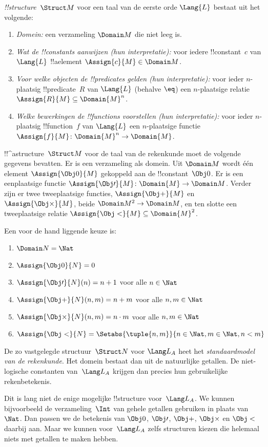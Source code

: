 \documentclass[openany]{memoir}
\begin{document}
\begin{defn}[!!^{structure}s]
 \emph{!!{structure}}~$\Struct M$ voor een taal van
de eerste orde $\Lang{L}$ bestaat uit het volgende:
\begin{enumerate}
\item \emph{Domein:} een verzameling $\Domain M$ die niet leeg is.
\item \emph{Wat de !!{constant}s aanwijzen (hun interpretatie):} voor
  iedere !!{constant}~$c$ van $\Lang{L}$ !!a{element}
  $\Assign{c}{M} \in \Domain M$.
\item \emph{Voor welke objecten de !!{predicate}s gelden (hun
  interpretatie):} voor ieder $n$-plaatsig !!{predicate}~$R$ van
  $\Lang{L}$ (behalve $\eq$) een $n$-plaatsige relatie
  $\Assign{R}{M} \subseteq \Domain{M}^n$.
\item \emph{Welke bewerkingen de !!{function}s voorstellen (hun
  interpretatie):} voor ieder $n$-plaatsig !!{function}~$f$ van
  $\Lang{L}$ een $n$-plaatsige functie
  $\Assign{f}{M} \colon \Domain{M}^n \to \Domain{M}$.
\end{enumerate}
\end{defn}

\begin{ex}
!!^a{structure}~$\Struct M$ voor de taal van de rekenkunde moet de
volgende gegevens bevatten. Er is een verzameling als domein. Uit
$\Domain M$ wordt één element $\Assign{\Obj 0}{M}$ gekoppeld aan de
!!{constant}~$\Obj 0$. Er is een eenplaatsige functie
$\Assign{\Obj \prime}{M} \colon \Domain{M} \to \Domain M$. Verder zijn
er twee tweeplaatsige functies, $\Assign{\Obj +}{M}$ en $\Assign{\Obj
\times}{M}$, beide $\Domain M^2 \to \Domain M$, en ten slotte een
tweeplaatsige relatie
$\Assign{\Obj <}{M} \subseteq \Domain{M}^2$.

Een voor de hand liggende keuze is:
\begin{enumerate}
\item $\Domain N = \Nat$
\item $\Assign{\Obj 0}{N} = 0$
\item $\Assign{\Obj \prime}{N}(n) = n + 1$ voor alle $n \in \Nat$
\item $\Assign{\Obj +}{N}(n, m) = n + m$ voor alle $n, m \in \Nat$
\item $\Assign{\Obj \times}{N}(n, m) = n\cdot m$ voor alle $n, m \in \Nat$
\item $\Assign{\Obj <}{N} = \Setabs{\tuple{n, m}}{n \in \Nat, m \in
  \Nat, n < m}$
\end{enumerate}
De zo vastgelegde structuur~$\Struct N$ voor $\Lang L_A$ heet het
\emph{standaardmodel van de rekenkunde}. Het domein bestaat dan uit de
natuurlijke getallen. De niet-logische constanten van~$\Lang L_A$
krijgen dan precies hun gebruikelijke rekenbetekenis.

Dit is lang niet de enige mogelijke !!{structure} voor~$\Lang L_A$.
We kunnen bijvoorbeeld de verzameling~$\Int$ van gehele getallen
gebruiken in plaats van~$\Nat$. Dan passen we de betekenis van $\Obj
0$, $\Obj \prime$, $\Obj +$, $\Obj \times$ en $\Obj <$ daarbij aan.
Maar we kunnen voor~$\Lang L_A$ zelfs structuren kiezen die helemaal niets met
getallen te maken hebben.
\end{ex}
\end{document}
